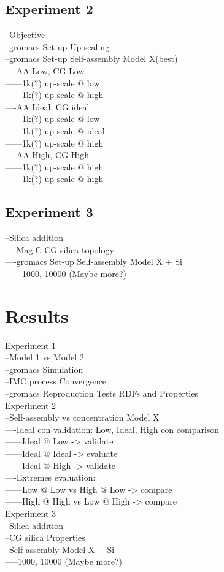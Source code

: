\documentclass[10pt,a4paper,twoside]{article}
\begin{document}
\subsection{Experiment 2}
 --Objective\\
 --gromacs Set-up Up-scaling \\
 --gromacs Set-up Self-assembly Model X(best)\\
  ----AA Low, CG Low\\
   ------1k(?) up-scale @ low\\
   ------1k(?) up-scale @ high\\
  ----AA Ideal, CG ideal\\
   ------1k(?) up-scale @ low\\
   ------1k(?) up-scale @ ideal\\
   ------1k(?) up-scale @ high  \\
  ----AA High, CG High\\
   ------1k(?) up-scale @ high\\
   ------1k(?) up-scale @ high
\subsection{Experiment 3}
 --Silica addition\\
  ----MagiC CG silica topology \\
  ----gromacs Set-up Self-assembly Model X + Si\\
   ------1000, 10000 (Maybe more?)
 
\section{Results}

Experiment 1\\
 --Model 1 vs Model 2 \\
 --gromacs Simulation\\
 --IMC process Convergence\\
 --gromacs Reproduction Tests RDFs and Properties\\
Experiment 2\\
 --Self-assembly vs concentration Model X\\
  ----Ideal con validation: Low, Ideal, High con comparison\\
   ------Ideal @ Low -> validate\\
   ------Ideal @ Ideal -> evaluate\\
   ------Ideal @ High -> validate\\
  ----Extremes evaluation:\\
  ------Low @ Low vs High @ Low -> compare\\
   ------High @ High vs Low @ High -> compare\\
Experiment 3\\
 --Silica addition\\
  --CG silica Properties \\
  --Self-assembly Model X + Si\\
   -----1000, 10000 (Maybe more?)\\
\end{document}
